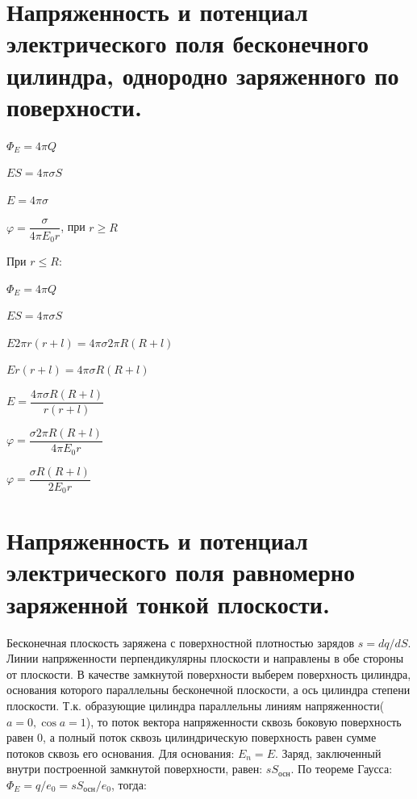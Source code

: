 \documentclass[12pt]{report}
\begin{document}
\section{Напряженность и потенциал электрического поля бесконечного цилиндра, однородно заряженного по поверхности.}
\begin{center}
    $ \Phi_E = 4\pi Q $
\end{center}
\begin{center}
    $ ES = 4 \pi \sigma S $
\end{center}
\begin{center}
    $E = 4 \pi \sigma $
\end{center}
\begin{center}
    $\varphi = \dfrac{\sigma}{4 \pi E_0 r}$, при $r \geq R$
\end{center}
\begin{center}
    При $r \leq R$:
\end{center}
\begin{center}
    $\Phi_E = 4 \pi Q$
\end{center}
\begin{center}
    $ES = 4 \pi \sigma S$
\end{center}
\begin{center}
    $E 2 \pi r(r + l) = 4 \pi \sigma 2 \pi R(R + l)$
\end{center}
\begin{center}
    $E  r(r + l) = 4 \pi \sigma  R(R + l)$
\end{center}
\begin{center}
    $E   = \dfrac{4 \pi \sigma  R(R + l)}{r(r + l)}$
\end{center}
\begin{center}
    $\varphi = \dfrac{\sigma 2 \pi R(R + l)}{4 \pi E_0 r} $
\end{center}
\begin{center}
    $\varphi = \dfrac{\sigma R(R + l)}{2 E_0 r} $
\end{center}
\section{Напряженность и потенциал электрического поля равномерно заряженной тонкой плоскости.}
Бесконечная плоскость заряжена с поверхностной плотностью зарядов $s=dq/dS$. Линии напряженности перпендикулярны плоскости и направлены в обе стороны от плоскости. В качестве замкнутой поверхности выберем поверхность цилиндра, основания которого параллельны бесконечной плоскости, а ось цилиндра степени плоскости.
Т.к. образующие цилиндра параллельны линиям напряженности( $a=0,\cos a=1$), то поток вектора напряженности сквозь боковую поверхность равен 0, а полный поток сквозь цилиндрическую поверхность равен сумме потоков сквозь его основания. Для основания: $E_n = E$. Заряд, заключенный внутри построенной замкнутой поверхности, равен: $sS_\text{осн}$.
По теореме Гаусса: $\Phi_E =q/e_0 = sS_\text{осн}/e_0$, тогда:
\end{document}
